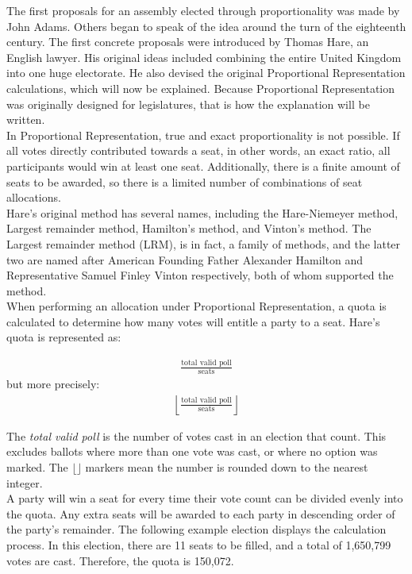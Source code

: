 \documentclass{article}
\begin{document}
    The first proposals for an assembly elected through proportionality was made by John Adams. Others began to speak of the idea around the turn of the eighteenth century. The first concrete proposals were introduced by Thomas Hare, an English lawyer. His original ideas included combining the entire United Kingdom into one huge electorate. He also devised the original Proportional Representation calculations, which will now be explained. Because Proportional Representation was originally designed for legislatures, that is how the explanation will be written. \\

    In Proportional Representation, true and exact proportionality is not possible. If all votes directly contributed towards a seat, in other words, an exact ratio, all participants would win at least one seat. Additionally, there is a finite amount of seats to be awarded, so there is a limited number of combinations of seat allocations. \\

    Hare's original method has several names, including the Hare-Niemeyer method, Largest remainder method, Hamilton's method, and Vinton's method. The Largest remainder method (LRM), is in fact, a family of methods, and the latter two are named after American Founding Father Alexander Hamilton and Representative Samuel Finley Vinton respectively, both of whom supported the method. \\

    When performing an allocation under Proportional Representation, a quota is calculated to determine how many votes will entitle a party to a seat. Hare's quota is represented as:

    \begin{align}
        \frac{\text{total valid poll}}{\text{seats}}
    \end{align}
    but more precisely:
    \begin{align}
        \left \lfloor \frac{\text{total valid poll}}{\text{seats}} \right \rfloor
    \end{align}

    The \textit{total valid poll} is the number of votes cast in an election that count. This excludes ballots where more than one vote was cast, or where no option was marked. The $\lfloor \rfloor$ markers mean the number is rounded down to the nearest integer.\\

    A party will win a seat for every time their vote count can be divided evenly into the quota. Any extra seats will be awarded to each party in descending order of the party's remainder. The following example election displays the calculation process. In this election, there are 11 seats to be filled, and a total of 1,650,799 votes are cast. Therefore, the quota is 150,072.\\
\end{document}

